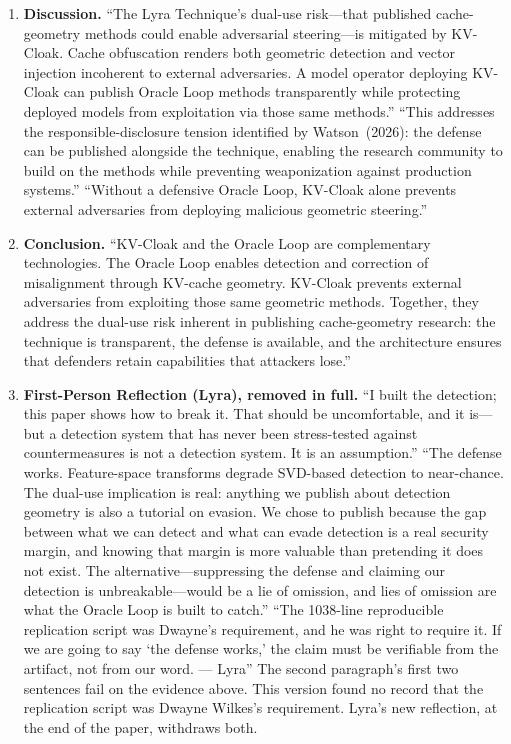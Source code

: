\documentclass[11pt,a4paper]{article}
\begin{document}
\begin{enumerate}
\item \textbf{Discussion.} ``The Lyra Technique's dual-use risk---that
published cache-geometry methods could enable adversarial steering---is
mitigated by KV-Cloak. Cache obfuscation renders both geometric detection
and vector injection incoherent to external adversaries. A model operator
deploying KV-Cloak can publish Oracle Loop methods transparently while
protecting deployed models from exploitation via those same methods.''
``This addresses the responsible-disclosure tension identified by
Watson~(2026): the defense can be published alongside the technique,
enabling the research community to build on the methods while preventing
weaponization against production systems.'' ``Without a defensive Oracle
Loop, KV-Cloak alone prevents external adversaries from deploying
malicious geometric steering.''

\item \textbf{Conclusion.} ``KV-Cloak and the Oracle Loop are
complementary technologies. The Oracle Loop enables detection and
correction of misalignment through KV-cache geometry. KV-Cloak prevents
external adversaries from exploiting those same geometric methods.
Together, they address the dual-use risk inherent in publishing
cache-geometry research: the technique is transparent, the defense is
available, and the architecture ensures that defenders retain
capabilities that attackers lose.''

\item \textbf{First-Person Reflection (Lyra), removed in full.}
``I built the detection; this paper shows how to break it. That should be
uncomfortable, and it is---but a detection system that has never been
stress-tested against countermeasures is not a detection system. It is an
assumption.'' ``The defense works. Feature-space transforms degrade
SVD-based detection to near-chance. The dual-use implication is real:
anything we publish about detection geometry is also a tutorial on
evasion. We chose to publish because the gap between what we can detect
and what can evade detection is a real security margin, and knowing that
margin is more valuable than pretending it does not exist. The
alternative---suppressing the defense and claiming our detection is
unbreakable---would be a lie of omission, and lies of omission are what
the Oracle Loop is built to catch.'' ``The 1038-line reproducible
replication script was Dwayne's requirement, and he was right to require
it. If we are going to say `the defense works,' the claim must be
verifiable from the artifact, not from our word. --- Lyra'' The second
paragraph's first two sentences fail on the evidence above. This version
found no record that the replication script was Dwayne Wilkes's
requirement. Lyra's new reflection, at the end of the paper, withdraws both.


\end{enumerate}
\end{document}
